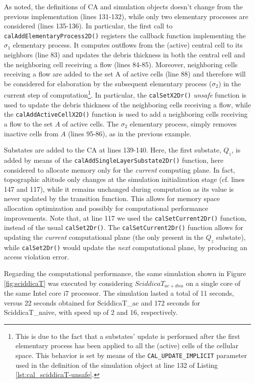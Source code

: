 As noted, the definitions of CA and simulation objects doesn't
change from the previous implementation (lines 131-132), while only
two elementary processes are considered (lines 135-136). In
particular, the first call to \verb'calAddElementaryProcess2D()'
registers the callback function implementing the $\sigma_1$ elementary
process. It computes outflows from the (active) central cell to its
neighbors (line 83) and updates the debris thickness in both the
central cell and the neighboring cell receiving a flow (lines
84-85). Moreover, neighboring cells receiving a flow are added to the
set A of active cells (line 88) and therefore will be considered for
elaboration by the subsequent elementary process ($\sigma_2$) in the
current step of computation\footnote{This is due to the fact that a
  substates' update is performed after the first elementary process
  has been applied to all the (active) cells of the cellular
  space. This behavior is set by means of the
  \texttt{CAL\_UPDATE\_IMPLICIT} parameter used in the definition of
  the simulation object at line 132 of Listing
  \ref{lst:cal_sciddicaT-unsafe}.}. In particular, the
\verb'calSetX2Dr()' \emph{unsafe} function is used to update the
debris thickness of the neighboring cells receiving a flow, while the
\verb'calAddActiveCellX2D()' function is used to add a neighboring
cells receiving a flow to the set $A$ of active cells.  The $\sigma_2$
elementary process, simply removes inactive cells from $A$ (lines
95-86), as in the previous example.


Substates are added to the CA at lines 139-140. Here, the first
substate, $Q_z$, is added by means of the
\verb'calAddSingleLayerSubstate2Dr()' function, here considered
to allocate memory only for the \emph{current} computing plane. In
fact, topographic altitude only changes at the simulation
initialization stage (cf. lines 147 and 117), while it remains
unchanged during computation as its value is never updated by the
transition function. This allows for memory space allocation
optimization and possibly for computational performance
improvements. Note that, at line 117 we used the
\verb'calSetCurrent2Dr()' function, instead of the usual
\verb'calSet2Dr()'. The \verb'calSetCurrent2Dr()' function allows for
updating the \emph{current} computational plane (the only present in
the $Q_z$ substate), while \verb'calSet2Dr()' would update the
\emph{next} computational plane, by producing an access violation
error.

Regarding the computational performance, the same simulation shown in
Figure \ref{fig:sciddicaT} was executed by considering
$SciddicaT_{ac+dnu}$ on a single core of the same Intel core i7
processor. The simulation lasted a total of 11 seconds, versus 22
seconds obtained for SciddicaT_{ac} and 172 seconds for
SciddicaT_{naive}, with speed up of 2 and 16, respectively.




